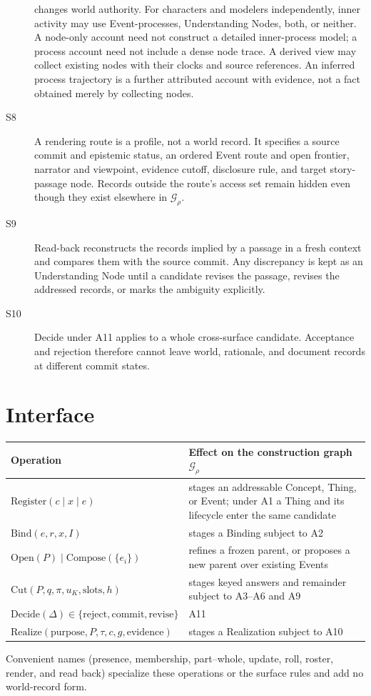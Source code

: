 \documentclass[11pt,a4paper]{article}
\begin{document}
\begin{description}
    changes world authority. For characters and modelers independently, inner
    activity may use Event-processes, Understanding Nodes, both, or neither.
    A node-only account need not construct a detailed inner-process model;
    a process account need not include a dense node trace. A derived view may
    collect existing nodes with their clocks and source references. An inferred
    process trajectory is a further attributed account with evidence, not a
    fact obtained merely by collecting nodes.
  \item[S8] A rendering route is a profile, not a world record. It specifies a
    source commit and epistemic status, an ordered Event route and open frontier,
    narrator and viewpoint, evidence cutoff, disclosure rule, and target
    story-passage node. Records outside the route's access set remain hidden
    even though they exist elsewhere in $\mathcal G_\rho$.
  \item[S9] Read-back reconstructs the records implied by a passage in a fresh
    context and compares them with the source commit. Any discrepancy is kept
    as an Understanding Node until a candidate revises the passage, revises the
    addressed records, or marks the ambiguity explicitly.
  \item[S10] Decide under A11 applies to a whole cross-surface candidate.
    Acceptance and rejection therefore cannot leave world, rationale, and
    document records at different commit states.
\end{description}

\section{Interface}

\begin{center}
\footnotesize
\begin{tabularx}{\textwidth}{@{}l Y@{}}
\toprule
Operation & Effect on the construction graph $\mathcal G_\rho$ \\
\midrule
$\mathrm{Register}(c\mid x\mid e)$ & stages an addressable Concept, Thing, or Event; under A1 a Thing and its lifecycle enter the same candidate \\
$\mathrm{Bind}(e,r,x,I)$ & stages a Binding subject to A2 \\
$\mathrm{Open}(P)\mid\mathrm{Compose}(\{e_i\})$ & refines a frozen parent, or proposes a new parent over existing Events \\
$\mathrm{Cut}(P,q,\pi,u_K,\mathrm{slots},h)$ & stages keyed answers and remainder subject to A3--A6 and A9 \\
$\mathrm{Decide}(\Delta)\in\{\mathrm{reject},\mathrm{commit},\mathrm{revise}\}$ & A11 \\
$\mathrm{Realize}(\mathrm{purpose},P,\tau,c,g,\mathrm{evidence})$ & stages a Realization subject to A10 \\
\bottomrule
\end{tabularx}
\end{center}
Convenient names (presence, membership, part--whole, update, roll, roster,
render, and read back) specialize these operations or the surface rules and add
no world-record form.
\end{document}
